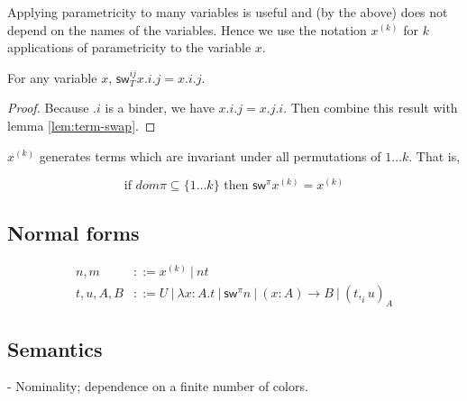 \documentclass[10pt,a4paper]{article}
\newcommand\CC[4]{(#2,_{#1} #3)_{#4}}
\newcommand\sw[2]{\mathsf{sw}^{#1}_{#2}}
\newcommand\pvar[2]{{#1}^{(#2)}}
\begin{document}
Applying parametricity to many variables is useful and (by the above)
does not depend on the names of the variables. Hence we use the
notation $\pvar x k$ for $k$ applications of parametricity to the
variable $x$.

\begin{lemma}\label{lem:sym-two}
  For any variable $x$, $\sw {ij} T x.i.j = x.i.j$.
\end{lemma}
\begin{proof}
  Because $.i$ is a binder, we have $x.i.j = x.j.i$. Then combine this
  result with lemma \ref{lem:term-swap}.
\end{proof}

\begin{corollary}
  $\pvar x k$ generates terms which are invariant under all permutations
  of $1…k$. That is, 

   $$   \text{if~} dom π ⊆ \{1…k\} \text{~then~} \sw {π} {} \pvar x k = \pvar x k$$
\end{corollary}

\subsection{Normal forms}

\begin{align*}
  n,m & ::= \pvar x k ~|~ n t \\
  t,u,A,B & ::= U ~|~ λx:A. t      ~|~ \sw {π} {} n ~|~  (x:A) → B 
             ~|~ \CC i t u A
\end{align*}


\subsection{Semantics}

- Nominality; dependence on a finite number of colors.
\end{document}

